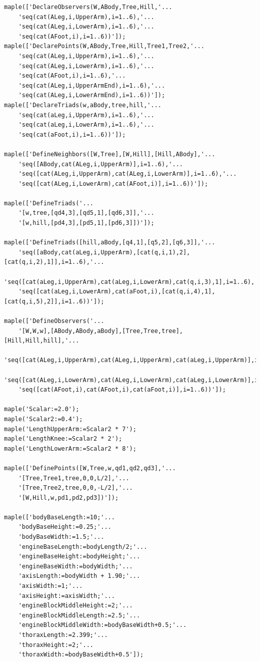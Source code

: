 \documentclass{article}
\begin{document}
\begin{verbatim}
maple(['DeclareObservers(W,ABody,Tree,Hill,'...
	'seq(cat(ALeg,i,UpperArm),i=1..6),'...
	'seq(cat(ALeg,i,LowerArm),i=1..6),'...
	'seq(cat(AFoot,i),i=1..6))']);
maple(['DeclarePoints(W,ABody,Tree,Hill,Tree1,Tree2,'...
	'seq(cat(ALeg,i,UpperArm),i=1..6),'...
	'seq(cat(ALeg,i,LowerArm),i=1..6),'...
	'seq(cat(AFoot,i),i=1..6),'...
	'seq(cat(ALeg,i,UpperArmEnd),i=1..6),'...
	'seq(cat(ALeg,i,LowerArmEnd),i=1..6))']);
maple(['DeclareTriads(w,aBody,tree,hill,'...
	'seq(cat(aLeg,i,UpperArm),i=1..6),'...
	'seq(cat(aLeg,i,LowerArm),i=1..6),'...
	'seq(cat(aFoot,i),i=1..6))']);

maple(['DefineNeighbors([W,Tree],[W,Hill],[Hill,ABody],'...
	'seq([ABody,cat(ALeg,i,UpperArm)],i=1..6),'...
	'seq([cat(ALeg,i,UpperArm),cat(ALeg,i,LowerArm)],i=1..6),'...
	'seq([cat(ALeg,i,LowerArm),cat(AFoot,i)],i=1..6))']);

maple(['DefineTriads('...
    '[w,tree,[qd4,3],[qd5,1],[qd6,3]],'...
    '[w,hill,[pd4,3],[pd5,1],[pd6,3]])']);

maple(['DefineTriads([hill,aBody,[q4,1],[q5,2],[q6,3]],'...
	'seq([aBody,cat(aLeg,i,UpperArm),[cat(q,i,1),2],[cat(q,i,2),1]],i=1..6),'...
	'seq([cat(aLeg,i,UpperArm),cat(aLeg,i,LowerArm),cat(q,i,3),1],i=1..6),'...
	'seq([cat(aLeg,i,LowerArm),cat(aFoot,i),[cat(q,i,4),1],[cat(q,i,5),2]],i=1..6))']);

maple(['DefineObservers('...
	'[W,W,w],[ABody,ABody,aBody],[Tree,Tree,tree],[Hill,Hill,hill],'...
	'seq([cat(ALeg,i,UpperArm),cat(ALeg,i,UpperArm),cat(aLeg,i,UpperArm)],i=1..6),'...
	'seq([cat(ALeg,i,LowerArm),cat(ALeg,i,LowerArm),cat(aLeg,i,LowerArm)],i=1..6),'...
	'seq([cat(AFoot,i),cat(AFoot,i),cat(aFoot,i)],i=1..6))']);

maple('Scalar:=2.0');
maple('Scalar2:=0.4');
maple('LengthUpperArm:=Scalar2 * 7');
maple('LengthKnee:=Scalar2 * 2');
maple('LengthLowerArm:=Scalar2 * 8');

maple(['DefinePoints([W,Tree,w,qd1,qd2,qd3],'...
    '[Tree,Tree1,tree,0,0,L/2],'...
    '[Tree,Tree2,tree,0,0,-L/2],'...
    '[W,Hill,w,pd1,pd2,pd3])']);

maple(['bodyBaseLength:=10;'...
	'bodyBaseHeight:=0.25;'...
	'bodyBaseWidth:=1.5;'...
	'engineBaseLength:=bodyLength/2;'...
	'engineBaseHeight:=bodyHeight;'...
	'engineBaseWidth:=bodyWidth;'...
	'axisLength:=bodyWidth + 1.90;'...
	'axisWidth:=1;'...
	'axisHeight:=axisWidth;'...
	'engineBlockMiddleHeight:=2;'...
	'engineBlockMiddleLength:=2.5;'...
	'engineBlockMiddleWidth:=bodyBaseWidth+0.5;'...
	'thoraxLength:=2.399;'...
	'thoraxHeight:=2;'...
	'thoraxWidth:=bodyBaseWidth+0.5']);
    

\end{verbatim}
\end{document}
